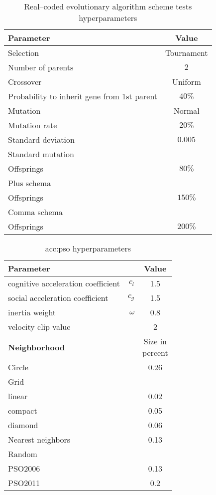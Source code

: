 \begin{table}[h]
    \centering
    \begin{tabular}{|l|c|}
        \hline
        \textbf{Parameter} & \textbf{Value} \\
        \hline
        Selection & Tournament \\
        \quad Number of parents & $2$ \\
        Crossover & Uniform \\
        \quad Probability to inherit gene from 1st parent & $40\%$ \\
        Mutation & Normal \\
        \quad Mutation rate & $20\%$ \\
        \quad Standard deviation & $0.005$ \\
        \hline
        Standard mutation & \\
        \quad Offsprings & $80\%$ \\
        Plus schema & \\
        \quad Offsprings & $150\%$ \\
        Comma schema & \\
        \quad Offsprings & $200\%$ \\
        \hline
    \end{tabular}
    \caption{Real--coded evolutionary algorithm scheme tests hyperparameters}
    \label{tab:esschemehyperparmarameters}
\end{table}

\begin{table}[h]
    \centering
    \begin{tabular}{|l r|c|}
        \hline
        \multicolumn{2}{|l|}{\textbf{Parameter}} & \textbf{Value} \\
        \hline
        cognitive acceleration coefficient & $c_l$ & 1.5 \\
        social acceleration coefficient  & $c_g$ & 1.5 \\
        inertia weight & $\omega$ & 0.8 \\
        velocity clip value & & 2 \\
        \hline \hline
        \textbf{Neighborhood} & & \makecell[c]{Size in\\ percent} \\
        \hline
        Circle & & 0.26 \\
        Grid & & \\
        \quad linear & & 0.02 \\
        \quad compact & & 0.05 \\
        \quad diamond & & 0.06 \\
        Nearest neighbors & & 0.13 \\
        Random & & \\
        \quad PSO2006 & & 0.13 \\
        \quad PSO2011 & & 0.2 \\ 
        \hline
    \end{tabular}
    \caption{\acrlong*{acc:pso} hyperparameters}
    \label{tab:psohyperparameters}
\end{table}